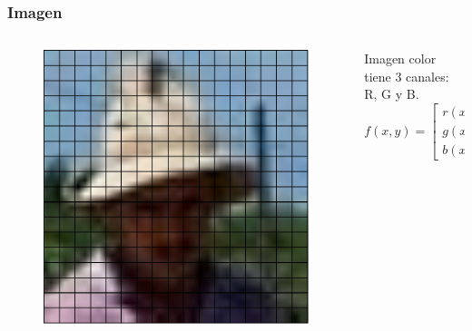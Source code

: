 \begin{frame}
    \frametitle{Imagen}
    
    \begin{columns}
    	\begin{column}{0.5\textwidth}
		    \begin{figure}[!h]
			\includegraphics[width=0.6\columnwidth]{images/image_pixels.pdf}
			\end{figure}
    	\end{column}
    	\begin{column}{0.3\textwidth}
		Imagen color tiene 3 canales: R, G y B.
		\begin{equation*}
			f(x,y)=
			\begin{bmatrix}
				r(x,y) \\
				g(x,y) \\
				b(x,y)
			\end{bmatrix}
		\end{equation*}
    	\end{column}
    \end{columns}
\end{frame}

